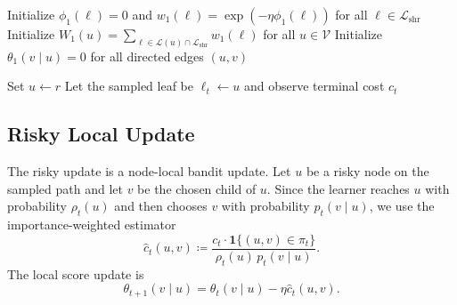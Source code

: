 \documentclass{article}
\begin{document}
\begin{algorithm}[t]
\caption{\textsc{BarrierShare}}
\label{alg:barriershare}

Initialize $\phi_1(\ell)=0$ and $w_1(\ell)=\exp(-\eta \phi_1(\ell))$ for all $\ell\in\mathcal{L}_{\mathrm{shr}}$\;
Initialize $W_1(u)=\sum_{\ell\in\mathcal{L}(u)\cap \mathcal{L}_{\mathrm{shr}}} w_1(\ell)$ for all $u\in\mathcal{V}$\;
Initialize $\theta_1(v\mid u)=0$ for all directed edges $(u,v)$\;

Set $u \leftarrow r$\;
Let the sampled leaf be $\ell_t \leftarrow u$ and observe terminal cost $c_t$\;


\end{algorithm}

\subsection{Risky Local Update}
\label{sec:barriershare_risky_update}

The risky update is a node-local bandit update. Let $u$ be a risky node on the sampled path and let $v$ be the chosen child of $u$. Since the learner reaches $u$ with probability $\rho_t(u)$ and then chooses $v$ with probability $p_t(v\mid u)$, we use the importance-weighted estimator
\begin{equation}
    \widehat{c}_t(u,v)
    \coloneqq
    \frac{c_t \cdot \mathbf{1}\{(u,v)\in\pi_t\}}{\rho_t(u)\,p_t(v\mid u)}.
    \label{eq:iw_estimator}
\end{equation}
The local score update is
\begin{equation}
    \theta_{t+1}(v\mid u)
    =
    \theta_t(v\mid u) - \eta \widehat{c}_t(u,v).
    \label{eq:risky_local_update}
\end{equation}
\end{document}
